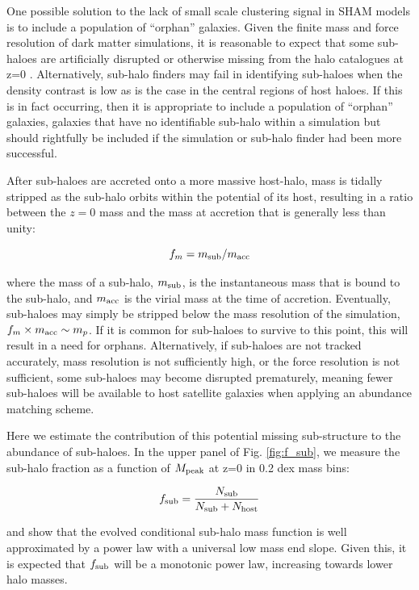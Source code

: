 \documentclass[a4paper,fleqn,usenatbib]{mnras}
\begin{document}
One possible solution to the lack of small scale clustering signal in SHAM models is to include a population of ``orphan'' galaxies.  Given the finite mass and force resolution of dark matter simulations, it is reasonable to expect that some sub-haloes are artificially disrupted or otherwise missing from the halo catalogues at z=0 \citep[][van den Bosch 2017 in prep.]{Carlberg:1994kl, vanKampen:1995ix, Guo:2013fm}.  Alternatively, sub-halo finders may fail in identifying sub-haloes when the density contrast is low \citep{Wetzel:2010ei, Muldrew:2011gr, Knebe:2011jc, Onions:2012iv, Knebe:2013bp, vandenBosch:2016ky} as is the case in the central regions of host haloes.  If this is in fact occurring, then it is appropriate to include a population of ``orphan'' galaxies, galaxies that have no identifiable sub-halo within a simulation but should rightfully be included if the simulation or sub-halo finder had been more successful.       

After sub-haloes are accreted onto a more massive host-halo, mass is tidally stripped as the sub-halo orbits within the potential of its host, resulting in a ratio between the $z=0$ mass and the mass at accretion that is generally less than unity:
%
\begin{linenomath}
\begin{equation}
f_m = m_{\rm sub}/m_{\rm acc}
\end{equation}
\end{linenomath}
%
where the mass of a sub-halo, $m_{\rm sub}$, is the instantaneous mass that is bound to the sub-halo, and $m_{\rm acc}$ is the virial mass at the time of accretion.  Eventually, sub-haloes may simply be stripped below the mass resolution of the simulation, $f_m \times m_{\rm acc} \sim m_p$.  If it is common for sub-haloes to survive to this point, this will result in a need for orphans.  Alternatively, if sub-haloes are not tracked accurately, mass resolution is not sufficiently high, or the force resolution is not sufficient, some sub-haloes may become disrupted prematurely, meaning fewer sub-haloes will be available to host satellite galaxies when applying an abundance matching scheme.

Here we estimate the contribution of this potential missing sub-structure to the abundance of sub-haloes.  In the upper panel of Fig. \ref{fig:f_sub}, we measure the sub-halo fraction as a function of $M_{\rm peak}$ at z=0 in 0.2 dex mass bins:
%
\begin{linenomath}
\begin{equation}
\label{eq:fsub}
f_{\rm sub}= \frac{N_{\rm sub}}{N_{\rm sub}+N_{\rm host}}
\end{equation}
\end{linenomath}
%
\cite{Jiang:2016dw} and \cite{vandenBosch:2016ky} show that the evolved conditional sub-halo mass function is well approximated by a power law with a universal low mass end slope.  Given this, it is expected that $f_{\rm sub}$ will be a monotonic power law, increasing towards lower halo masses.
\end{document}
